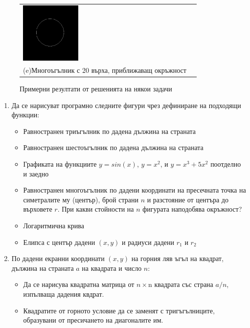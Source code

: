 {\begin{figure}
\begin{center}
\begin{tabular}{|p{5.2cm}p{5.2cm}|}
   \vspace{10pt}
   \includegraphics[width=3cm]{images/graph_twentygon}   &
    \\
    (e)Многоъгълник с 20 върха, приближаващ окръжност
   \vspace{10pt} &
   \\\hline
  \end{tabular}
  \end{center}

  \caption{Примерни резултати от решенията на някои задачи}
  \label{fig:drawings}
\end{figure}



\begin{enumerate}[resume]


	\item Да се нарисуват програмно следните фигури чрез дефиниране на подходящи функции:

	\begin{itemize}
		\item Равностранен триъгълник по дадена дължина на страната
		\item Равностранен шестоъгълник по дадена дължина на страната
		\item Графиката на функциите $y=sin(x)$, $y=x^2$, и $y=x^3+5x^2$ поотделно и заедно
    \item Равностранен многоъгълник по дадени координати на пресечната точка на симетралите му (център), брой страни $n$ и разстояние от центъра до върховете $r$. При какви стойности на $n$ фигурата наподобява окръжност?
		\item Логаритмична крива
		\item Елипса с център дадени $(x,y)$ и радиуси дадени $r_1$ и $r_2$
	\end{itemize}

	\item По дадени екранни координати $(x,y)$ на горния ляв ъгъл на квадрат, дължина на страната $a$ на квадрата и число $n$:

	\begin{itemize}
		\item Да се нарисува квадратна матрица от $n \times $n квадрата със страна $a/n$, изпълваща дадения квдрат.
		\item Квадратите от горното условие да се заменят с тригъгълниците, образувани от пресичането на диагоналите им.
	\end{itemize}





\end{enumerate}}
